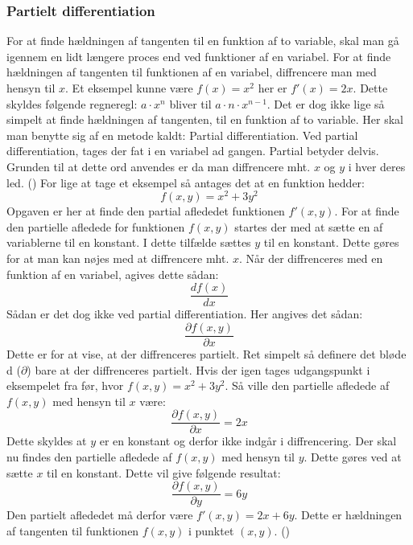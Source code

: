 \subsubsection{Partielt differentiation}
For at finde hældningen af tangenten til en funktion af to variable, skal man gå igennem en lidt længere proces end ved funktioner af en variabel. For at finde hældningen af tangenten til funktionen af en variabel, diffrencere man med hensyn til $x$. Et eksempel kunne være $f(x) = x^2$ her er $f'(x) = 2x$. Dette skyldes følgende regneregl: $a \cdot x^n$ bliver til $a \cdot n \cdot x^{n-1}$. Det er dog ikke lige så simpelt at finde hældningen af tangenten, til en funktion af to variable. Her skal man benytte sig af en metode kaldt: Partial differentiation. Ved partial differentiation, tages der fat i en variabel ad gangen. Partial betyder delvis. Grunden til at dette ord anvendes er da man diffrencere mht. $x$ og $y$ i hver deres led. (\cite[4]{Larsen2016}) For lige at tage et eksempel så antages det at en funktion hedder: 
\begin{equation}f(x,y) = x^2 + 3y^2\end{equation}
Opgaven er her at finde den partial aflededet funktionen $f'(x,y)$. For at finde den partielle afledede for funktionen $f(x,y)$ startes der med at sætte en af variablerne til en konstant. I dette tilfælde sættes $y$ til en konstant. Dette gøres for at man kan nøjes med at diffrencere mht. $x$. Når der diffrenceres med en funktion af en variabel, agives dette sådan: \begin{equation}\frac{d f(x)}{d x}\end{equation} Sådan er det dog ikke ved partial differentiation. Her angives det sådan: \begin{equation}\frac{\partial f(x,y)}{\partial x}\end{equation} Dette er for at vise, at der diffrenceres partielt. Ret simpelt så definere det bløde d ($\partial$) bare at der diffrenceres partielt. Hvis der igen tages udgangspunkt i eksempelet fra før, hvor $f(x,y) = x^2 + 3y^2$. Så ville den partielle afledede af $f(x,y)$ med hensyn til $x$ være: \begin{equation}\frac{\partial f(x,y)}{\partial x} = 2x\end{equation}
Dette skyldes at $y$ er en konstant og derfor ikke indgår i diffrencering. Der skal nu findes den partielle afledede af $f(x,y)$ med hensyn til $y$. Dette gøres ved at sætte $x$ til en konstant. Dette vil give følgende resultat: \begin{equation}\frac{\partial f(x,y)}{\partial y} = 6y\end{equation} Den partielt aflededet må derfor være $f'(x,y) = 2x + 6y$. Dette er hældningen af tangenten til funktionen $f(x,y)$ i punktet $(x,y)$. (\cite[7-9]{ForberedelsessetMaj2013})

